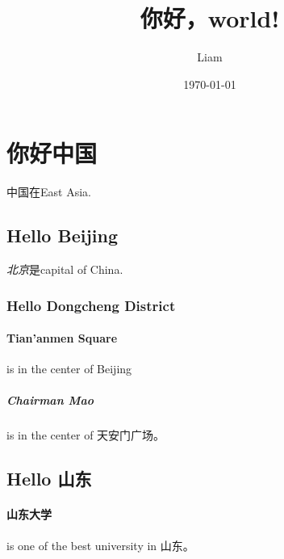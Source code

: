 \documentclass[UTF8]{ctexart}
\title{你好，world!}  %
\author{Liam}  %
\date{\today}  %
\begin{document}
\maketitle  %
\tableofcontents  %

\section{你好中国}
中国在East Asia.

\subsection{Hello Beijing}
\emph{北京}是capital of China.

\subsubsection{Hello Dongcheng District}

\paragraph{Tian'anmen Square}
is in the center of Beijing

\subparagraph{Chairman Mao}
is in the center of 天安门广场。

\subsection{Hello 山东}

\paragraph{山东大学} is one of the best university in 山东。
\end{document}
